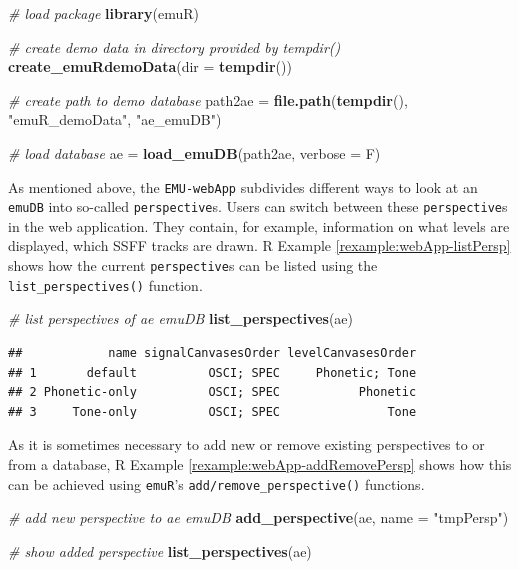 \documentclass[]{book}
\newenvironment{Shaded}{\begin{snugshade}}{\end{snugshade}}
\newcommand{\CommentTok}[1]{\textcolor[rgb]{0.56,0.35,0.01}{\textit{#1}}}
\newcommand{\DataTypeTok}[1]{\textcolor[rgb]{0.13,0.29,0.53}{#1}}
\newcommand{\KeywordTok}[1]{\textcolor[rgb]{0.13,0.29,0.53}{\textbf{#1}}}
\newcommand{\NormalTok}[1]{#1}
\newcommand{\StringTok}[1]{\textcolor[rgb]{0.31,0.60,0.02}{#1}}
\theoremstyle{definition}
\theoremstyle{definition}
\theoremstyle{definition}
\theoremstyle{remark}
\begin{document}
\begin{Shaded}
\begin{Highlighting}[]
\CommentTok{# load package}
\KeywordTok{library}\NormalTok{(emuR)}

\CommentTok{# create demo data in directory provided by tempdir()}
\KeywordTok{create_emuRdemoData}\NormalTok{(}\DataTypeTok{dir =} \KeywordTok{tempdir}\NormalTok{())}

\CommentTok{# create path to demo database}
\NormalTok{path2ae =}\StringTok{ }\KeywordTok{file.path}\NormalTok{(}\KeywordTok{tempdir}\NormalTok{(), }\StringTok{"emuR_demoData"}\NormalTok{, }\StringTok{"ae_emuDB"}\NormalTok{)}

\CommentTok{# load database}
\NormalTok{ae =}\StringTok{ }\KeywordTok{load_emuDB}\NormalTok{(path2ae, }\DataTypeTok{verbose =}\NormalTok{ F)}
\end{Highlighting}
\end{Shaded}

As mentioned above, the \texttt{EMU-webApp} subdivides different ways to
look at an \texttt{emuDB} into so-called \texttt{perspective}s. Users
can switch between these \texttt{perspective}s in the web application.
They contain, for example, information on what levels are displayed,
which SSFF tracks are drawn. R Example \ref{rexample:webApp-listPersp}
shows how the current \texttt{perspective}s can be listed using the
\texttt{list\_perspectives()} function.

\begin{Shaded}
\begin{Highlighting}[]
\CommentTok{# list perspectives of ae emuDB}
\KeywordTok{list_perspectives}\NormalTok{(ae)}
\end{Highlighting}
\end{Shaded}

\begin{verbatim}
##            name signalCanvasesOrder levelCanvasesOrder
## 1       default          OSCI; SPEC     Phonetic; Tone
## 2 Phonetic-only          OSCI; SPEC           Phonetic
## 3     Tone-only          OSCI; SPEC               Tone
\end{verbatim}

As it is sometimes necessary to add new or remove existing perspectives
to or from a database, R Example \ref{rexample:webApp-addRemovePersp}
shows how this can be achieved using \texttt{emuR}'s
\texttt{add/remove\_perspective()} functions.

\begin{Shaded}
\begin{Highlighting}[]
\CommentTok{# add new perspective to ae emuDB}
\KeywordTok{add_perspective}\NormalTok{(ae,}
                \DataTypeTok{name =} \StringTok{"tmpPersp"}\NormalTok{)}

\CommentTok{# show added perspective}
\KeywordTok{list_perspectives}\NormalTok{(ae)}
\end{Highlighting}
\end{Shaded}
\end{document}
